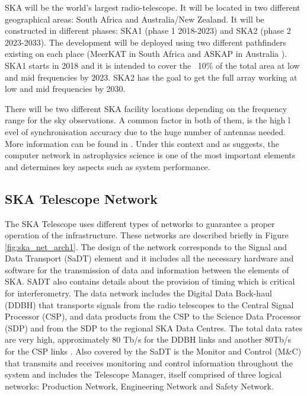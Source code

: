 SKA will be the world's largest radio-telescope. It will be located in two different geographical areas: South Africa and Australia/New Zealand. It will be
constructed in different phases: SKA1 (phase 1 2018-2023) and SKA2 (phase 2
2023-2033). The development will be deployed using two different pathfinders
existing on each place (MeerKAT in South Africa \cite{ska:meerkat} and ASKAP in Australia \cite{ska:askap}).  
SKA1 starts in 2018 and it is intended to cover the ~10\% of
the total area at low and mid frequencies by 2023. SKA2 has
the goal to get the full array working at low and mid frequencies by 2030.

There will be two different SKA facility locations depending on the frequency
range for the sky observations. A common factor in both of them, is the high l
evel of synchronisation accuracy due to the huge number of antennas needed.
More information can be found in  \cite{ska:baseline_description_v2}. Under
this context and as \cite{HUANG201727} suggests, the computer network in
astrophysics science is one of the most important elements and determines key
aspects such as system performance.

\subsection{SKA Telescope Network} \label{subsec:ska-telescope}

The SKA Telescope uses different types of networks to guarantee a proper
operation of the infrastructure. These networks are described briefly in
Figure \ref{fig:ska_net_arch1}. The design of the network corresponds to the
Signal and Data Transport (SaDT) element \cite{ska:sadt_website} and it
includes all the necessary hardware and software for the transmission of data and
information between the elements of SKA. SADT also contains details about
the provision of timing which is critical for interferometry.  The data network
includes the Digital Data Back-haul (DDBH) that transports signals from the
radio telescopes to the Central Signal Processor (CSP), and data products from
the CSP to the Science Data Processor (SDP) and from the SDP to the regional
SKA Data Centres. The total data rates are very high, approximately 80 Tb/s for
the DDBH links and another 80Tb/s for the CSP links \cite{ska:consortia-news}.
Also covered by the SaDT is the Monitor and Control (M\&C) that transmits and
receives monitoring and control information throughout the system and includes
the Telescope Manager, itself comprised of three logical networks: Production
Network, Engineering Network and Safety Network.


